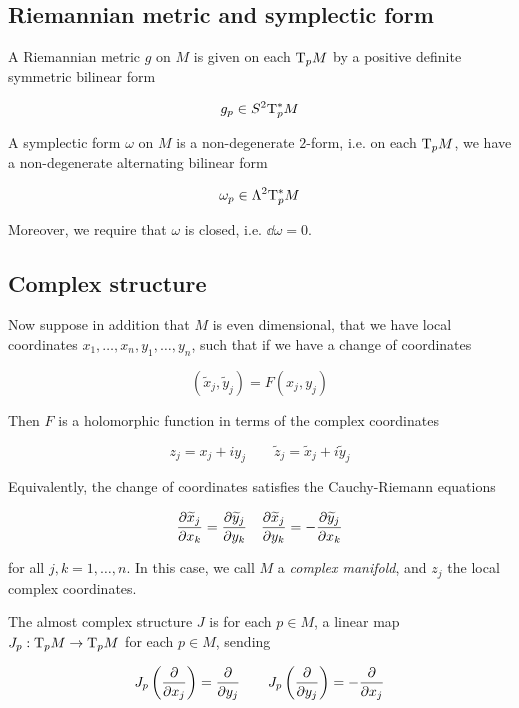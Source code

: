 \documentclass{article}
\renewcommand{\tilde}{\widetilde}
\begin{document}
\subsection{Riemannian metric and symplectic form}

\begin{definition}
     A Riemannian metric \(g\) on \(M\) is given on each \(\mathrm{T}_pM\) by a positive definite symmetric bilinear form

    \[g_p \in S^2 \mathrm{T}_p^*M\]
\end{definition}

\begin{definition}
     A symplectic form \(\omega\) on \(M\) is a non-degenerate \(2\)-form, i.e. on each \(\mathrm{T}_pM\), we have a non-degenerate alternating bilinear form

    \[\omega_p \in \Lambda^2 \mathrm{T}_p^*M\]

    Moreover, we require that \(\omega\) is closed, i.e. \(\dd\omega = 0\).
\end{definition}

\subsection{Complex structure}

Now suppose in addition that \(M\) is even dimensional, that we have local coordinates \(x_1, \dots, x_n, y_1, \dots, y_n\), such that if we have a change of coordinates

\[(\tilde x_j, \tilde y_j) = F(x_j, y_j)\]

Then \(F\) is a holomorphic function in terms of the complex coordinates

\[z_j = x_j + iy_j \quad\quad \tilde z_j = \tilde x_j + i\tilde y_j\]

Equivalently, the change of coordinates satisfies the Cauchy-Riemann equations

\[\pdv{\tilde x_j}{x_k} = \pdv{\tilde y_j}{y_k} \quad \pdv{\tilde x_j}{y_k} = -\pdv{\tilde y_j}{x_k}\]

for all \(j, k = 1, \dots, n\). In this case, we call \(M\) a \emph{complex manifold}, and \(z_j\) the local complex coordinates.

\begin{definition}
     The almost complex structure \(J\) is for each \(p \in M\), a linear map \(J_p : \mathrm{T}_pM \to \mathrm{T}_pM\) for each \(p \in M\), sending

    \[J_p\left(\pdv{x_j}\right) = \pdv{y_j} \qquad J_p\left(\pdv{y_j}\right) = -\pdv{x_j}\]
\end{definition}
\end{document}
